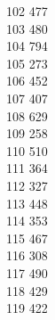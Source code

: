 { 102	477 \\
 103	480 \\
 104	794 \\
 105	273 \\
 106	452 \\
 107	407 \\
 108	629 \\
 109	258 \\
 110	510 \\
 111	364 \\
 112	327 \\
 113	448 \\
 114	353 \\
 115	467 \\
 116	308 \\
 117	490 \\
 118	429 \\
 119	422 \\
}
